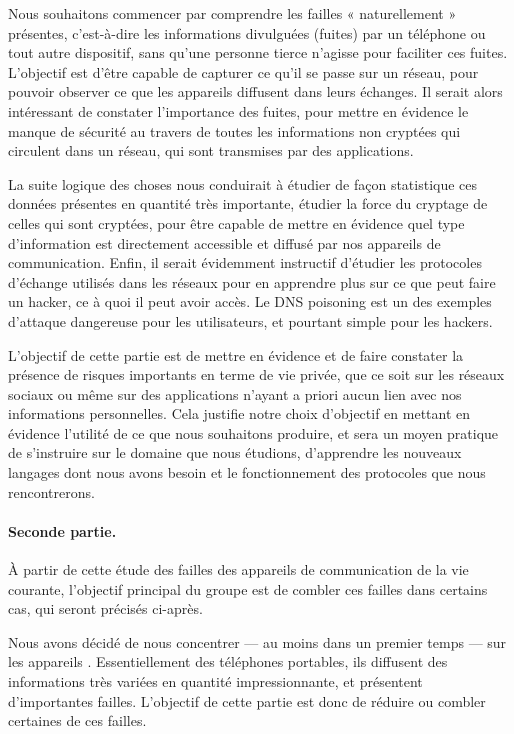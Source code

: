 \documentclass[a4paper, 12pt,twoside]{article}
\begin{document}
		Nous souhaitons commencer par comprendre les failles «  naturellement  » présentes, c'est-à-dire les informations divulguées (fuites) par un téléphone ou tout autre dispositif, sans qu'une personne tierce n'agisse pour faciliter ces fuites. L'objectif est d'être capable de capturer ce qu'il se passe sur un réseau, pour pouvoir observer ce que les appareils diffusent dans leurs échanges. Il serait alors intéressant de constater l'importance des fuites, pour mettre en évidence le manque de sécurité au travers de toutes les informations non cryptées qui circulent dans un réseau, qui sont transmises par des applications.
		
		La suite logique des choses nous conduirait à étudier de façon statistique ces données présentes en quantité très importante, étudier la force du cryptage de celles qui sont cryptées, pour être capable de mettre en évidence quel type d'information est directement accessible et diffusé par nos appareils de communication. Enfin,  il serait évidemment instructif d'étudier les protocoles d'échange utilisés dans les réseaux pour en apprendre plus sur ce que peut faire un hacker, ce à quoi il peut avoir accès. Le DNS poisoning est un des exemples d'attaque dangereuse pour les utilisateurs, et pourtant simple pour les hackers.
		
		L'objectif de cette partie est de mettre en évidence et de faire constater la présence de risques importants en terme de vie privée, que ce soit sur les réseaux sociaux ou même sur des applications n'ayant a priori aucun lien avec nos informations personnelles. Cela justifie notre choix d'objectif en mettant en évidence l'utilité de ce que nous souhaitons produire, et sera un moyen pratique de s'instruire sur le domaine que nous étudions, d'apprendre les nouveaux langages dont nous avons besoin et le fonctionnement des protocoles que nous rencontrerons.
		
		\paragraph{Seconde partie. } À partir de cette étude des failles des appareils de communication de la vie courante, l'objectif principal du groupe est de combler ces failles dans certains cas, qui seront précisés ci-après.
		
		Nous avons décidé de nous concentrer — au moins dans un premier temps — sur les appareils \Android{}. Essentiellement des téléphones portables, ils diffusent des informations très variées en quantité impressionnante, et présentent d'importantes failles. L'objectif de cette partie est donc de réduire ou combler certaines de ces failles.
		
\end{document}

